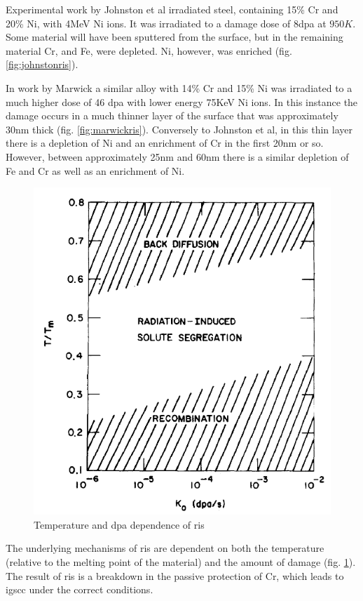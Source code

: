 \FloatBarrier

Experimental work by Johnston et al irradiated steel, containing 15\% Cr and 20\% Ni, with 4MeV Ni ions.  It was irradiated to a damage dose of 8\acrshort{dpa} at $950K$.  Some material will have been sputtered from the surface, but in the remaining material Cr, and Fe, were depleted.  Ni, however, was enriched (fig. \ref{fig:johnstonris}).

In work by Marwick a similar alloy with 14\% Cr and 15\% Ni was irradiated to a much higher dose of 46 \acrshort{dpa} with lower energy 75KeV Ni ions.  In this instance the damage occurs in a much thinner layer of the surface that was approximately 30nm thick (fig. \ref{fig:marwickris}).  Conversely to Johnston et al, in this thin layer there is a depletion of Ni and an enrichment of Cr in the first 20nm or so.  However, between approximately 25nm and 60nm there is a similar depletion of Fe and Cr as well as an enrichment of Ni.


\begin{figure}[h]
  \begin{center}
    \includegraphics[width=.5\linewidth]{chapters/background_austenitic_steels_in_nuclear/images/okamoto_rehn_temp_ris.png}
    \caption{Temperature and \acrshort{dpa} dependence of \acrshort{ris}\cite{risokamoto}}
    \label{fig:ristemperature}
  \end{center}
\end{figure}

The underlying mechanisms of \acrshort{ris} are dependent on both the temperature (relative to the melting point of the material) and the amount of damage (fig. \ref{fig:ristemperature}).  The result of \acrshort{ris} is a breakdown in the passive protection of Cr, which leads to \acrshort{igscc} under the correct conditions.



